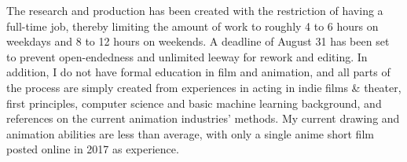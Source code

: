 The research and production has been created with the restriction of having a full-time job, thereby limiting the amount of work to roughly 4 to 6 hours on weekdays and 8 to 12 hours on weekends. A deadline of August 31 has been set to prevent open-endedness and unlimited leeway for rework and editing. In addition, I do not have formal education in film and animation, and all parts of the process are simply created from experiences in acting in indie films \& theater, first principles, computer science and basic machine learning background, and references on the current animation industries' methods. My current drawing and animation abilities are less than average, with only a single anime short film posted online in 2017 as experience.